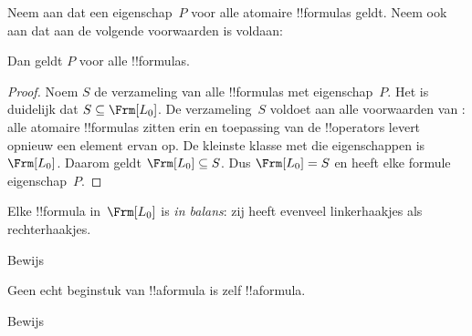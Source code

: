 \documentclass[../../../include/open-logic-section]{subfiles}
\begin{document}


\begin{thm}
  Neem aan dat een eigenschap~$P$ voor alle atomaire !!{formula}s
  geldt. Neem ook aan dat aan de volgende voorwaarden is voldaan:
  \begin{enumerate}
  \end{enumerate}
  Dan geldt $P$ voor alle !!{formula}s.
\end{thm}

\begin{proof}
  Noem $S$ de verzameling van alle !!{formula}s met eigenschap~$P$.
  Het is duidelijk dat $S \subseteq \Frm[L_0]$. De verzameling~$S$ voldoet
  aan alle voorwaarden van : alle atomaire
  !!{formula}s zitten erin en toepassing van de !!{operator}s levert
  opnieuw een element ervan op. De kleinste klasse met die eigenschappen
  is $\Frm[L_0]$. Daarom geldt $\Frm[L_0] \subseteq S$. Dus
  $\Frm[L_0] = S$ en heeft elke
  formule eigenschap~$P$.
\end{proof}

\begin{prop}
   Elke !!{formula} in~$\Frm[L_0]$ is \emph{in balans}: zij heeft
   evenveel linkerhaakjes als rechterhaakjes.
\end{prop}

\begin{prob}
Bewijs 
\end{prob}

\begin{prop} 
Geen echt beginstuk van !!a{formula} is zelf !!a{formula}.
\end{prop}

\begin{prob}
  Bewijs 
\end{prob}
\end{document}
